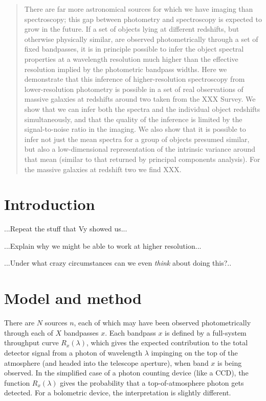 \documentclass[12pt,preprint,letterpaper]{aastex}
\begin{document}
\begin{abstract}
There are far more astronomical sources for which we have imaging than spectroscopy;
  this gap between photometry and spectroscopy is expected to grow in the future.
If a set of objects lying at different redshifts,
  but otherwise physically similar,
  are observed photometrically through a set of fixed bandpasses,
  it is in principle possible to infer the object spectral properties at a wavelength resolution
  much higher than the effective resolution implied by the photometric bandpass widths.
Here we demonstrate that this inference of higher-resolution spectroscopy
  from lower-resolution photometry
  is possible in a set of real observations of massive galaxies at redshifts around two
  taken from the XXX Survey.
We show that we can infer both the spectra and the individual object redshifts simultaneously,
  and that the quality of the inference is limited by the signal-to-noise ratio in the imaging.
We also show that it is possible to infer not just the mean spectra for a group of objects presumed similar,
  but also a low-dimensional representation of the intrinsic variance around that mean
  (similar to that returned by principal components analysis).
For the massive galaxies at redshift two we find XXX.
\end{abstract}

\section{Introduction}

...Repeat the stuff that Vy showed us...

...Explain why we might be able to work at higher resolution...

...Under what crazy circumstances can we even \emph{think} about doing this?..

\section{Model and method}

There are $N$ sources $n$, each of which may have been observed photometrically through each of $X$ bandpasses $x$.
Each bandpass $x$ is defined by a full-system throughput curve $R_x(\lambda)$,
  which gives the expected contribution to the total detector signal from a photon of wavelength $\lambda$
  impinging on the top of the atmosphere (and headed into the telescope aperture),
  when band $x$ is being observed.
In the simplified case of a photon counting device (like a CCD),
  the function $R_x(\lambda)$ gives the probability that a top-of-atmosphere photon gets detected.
For a bolometric device, the interpretation is slightly different.
\end{document}
